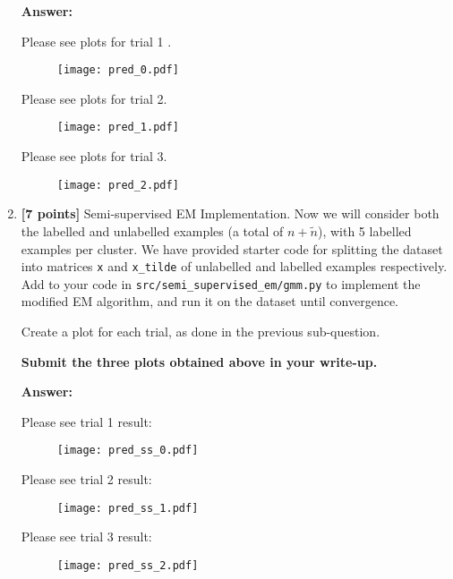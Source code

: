 \documentclass{article}
\begin{document}
\begin{enumerate}[label=(\alph*)]
\textbf{Answer:}

Please see plots for trial 1 .
\begin{figure}[H]
    \centering
    \texttt{[image: pred\_0.pdf]}
    \label{fig:pred0}
\end{figure}

Please see plots for trial 2.
\begin{figure}[H]
    \centering
    \texttt{[image: pred\_1.pdf]}
    \label{fig:pred1}
\end{figure}

Please see plots for trial 3.
\begin{figure}[H]
    \centering
    \texttt{[image: pred\_2.pdf]}
    \label{fig:pred2}
\end{figure}

 
\item \textbf{[7 points]} Semi-supervised EM Implementation. Now we will consider both the labelled and unlabelled examples (a total of $ n + \tilde{n} $), with 5 labelled examples per cluster. We have provided starter code for splitting the dataset into matrices \texttt{x} and \texttt{x\_tilde} of unlabelled and labelled examples respectively. Add to your code in \texttt{src/semi\_supervised\_em/gmm.py} to implement the modified EM algorithm, and run it on the dataset until convergence.

Create a plot for each trial, as done in the previous sub-question.

\textbf{Submit the three plots obtained above in your write-up.}

\textbf{Answer:}

Please see trial 1 result:

\begin{figure}[H]
    \centering
    \texttt{[image: pred\_ss\_0.pdf]}
    \label{fig:baseline}
\end{figure}

Please see trial 2 result:

\begin{figure}[H]
    \centering
    \texttt{[image: pred\_ss\_1.pdf]}
    \label{fig:baseline}
\end{figure}

Please see trial 3 result:

\begin{figure}[H]
    \centering
    \texttt{[image: pred\_ss\_2.pdf]}
    \label{fig:baseline}
\end{figure}



\end{enumerate}
\end{document}
